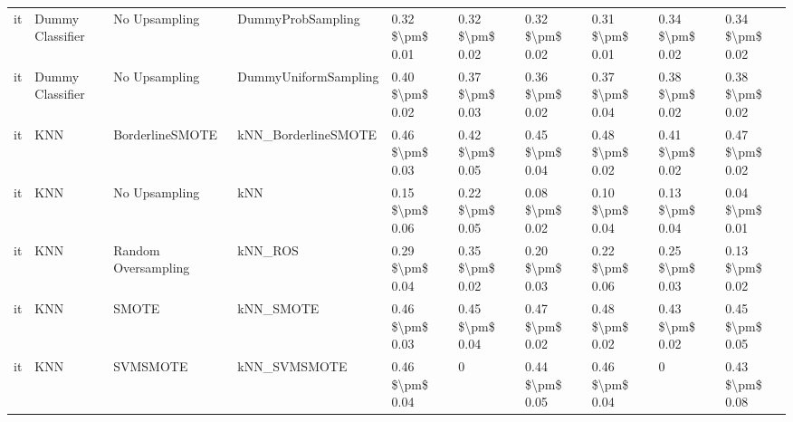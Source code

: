 \begin{tabular}{llllllllll}
      it &                Dummy Classifier &                 No Upsampling &                            DummyProbSampling & 0.32 \$\textbackslash pm\$ 0.01 &           0.32 \$\textbackslash pm\$ 0.02 &       0.32 \$\textbackslash pm\$ 0.02 &        0.31 \$\textbackslash pm\$ 0.01 &                         0.34 \$\textbackslash pm\$ 0.02 &     0.34 \$\textbackslash pm\$ 0.02 \\
      it &                Dummy Classifier &                 No Upsampling &                         DummyUniformSampling & 0.40 \$\textbackslash pm\$ 0.02 &           0.37 \$\textbackslash pm\$ 0.03 &       0.36 \$\textbackslash pm\$ 0.02 &        0.37 \$\textbackslash pm\$ 0.04 &                         0.38 \$\textbackslash pm\$ 0.02 &     0.38 \$\textbackslash pm\$ 0.02 \\
      it &                             KNN &               BorderlineSMOTE &                          kNN\_BorderlineSMOTE & 0.46 \$\textbackslash pm\$ 0.03 &           0.42 \$\textbackslash pm\$ 0.05 &       0.45 \$\textbackslash pm\$ 0.04 &        0.48 \$\textbackslash pm\$ 0.02 &                         0.41 \$\textbackslash pm\$ 0.02 &     0.47 \$\textbackslash pm\$ 0.02 \\
      it &                             KNN &                 No Upsampling &                                          kNN & 0.15 \$\textbackslash pm\$ 0.06 &           0.22 \$\textbackslash pm\$ 0.05 &       0.08 \$\textbackslash pm\$ 0.02 &        0.10 \$\textbackslash pm\$ 0.04 &                         0.13 \$\textbackslash pm\$ 0.04 &     0.04 \$\textbackslash pm\$ 0.01 \\
      it &                             KNN &           Random Oversampling &                                      kNN\_ROS & 0.29 \$\textbackslash pm\$ 0.04 &           0.35 \$\textbackslash pm\$ 0.02 &       0.20 \$\textbackslash pm\$ 0.03 &        0.22 \$\textbackslash pm\$ 0.06 &                         0.25 \$\textbackslash pm\$ 0.03 &     0.13 \$\textbackslash pm\$ 0.02 \\
      it &                             KNN &                         SMOTE &                                    kNN\_SMOTE & 0.46 \$\textbackslash pm\$ 0.03 &           0.45 \$\textbackslash pm\$ 0.04 &       0.47 \$\textbackslash pm\$ 0.02 &        0.48 \$\textbackslash pm\$ 0.02 &                         0.43 \$\textbackslash pm\$ 0.02 &     0.45 \$\textbackslash pm\$ 0.05 \\
      it &                             KNN &                      SVMSMOTE &                                 kNN\_SVMSMOTE & 0.46 \$\textbackslash pm\$ 0.04 &                         0 &       0.44 \$\textbackslash pm\$ 0.05 &        0.46 \$\textbackslash pm\$ 0.04 &                                       0 &     0.43 \$\textbackslash pm\$ 0.08 \\

\end{tabular}

